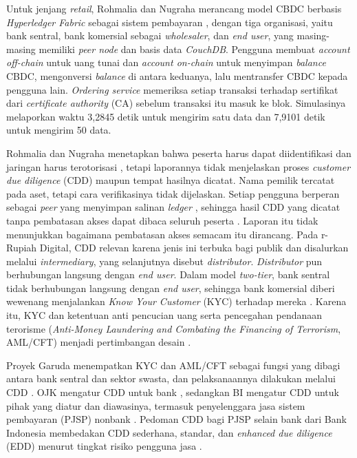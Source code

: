 Untuk jenjang \textit{retail}, Rohmalia dan Nugraha merancang model CBDC berbasis \textit{Hyperledger Fabric} sebagai sistem pembayaran \cite{rohmalia2023retail}, dengan tiga organisasi, yaitu bank sentral, bank komersial sebagai \textit{wholesaler}, dan \textit{end user}, yang masing-masing memiliki \textit{peer node} dan basis data \textit{CouchDB}. Pengguna membuat \textit{account off-chain} untuk uang tunai dan \textit{account on-chain} untuk menyimpan \textit{balance} CBDC, mengonversi \textit{balance} di antara keduanya, lalu mentransfer CBDC kepada pengguna lain. \textit{Ordering service} memeriksa setiap transaksi terhadap sertifikat dari \textit{certificate authority} (CA) sebelum transaksi itu masuk ke blok. Simulasinya melaporkan waktu 3,2845 detik untuk mengirim satu data dan 7,9101 detik untuk mengirim 50 data.

Rohmalia dan Nugraha menetapkan bahwa peserta harus dapat diidentifikasi dan jaringan harus terotorisasi \cite{rohmalia2023retail}, tetapi laporannya tidak menjelaskan proses \textit{customer due diligence} (CDD) maupun tempat hasilnya dicatat. Nama pemilik tercatat pada aset, tetapi cara verifikasinya tidak dijelaskan. Setiap pengguna berperan sebagai \textit{peer} yang menyimpan salinan \textit{ledger} \cite{rohmalia2023retail}, sehingga hasil CDD yang dicatat tanpa pembatasan akses dapat dibaca seluruh peserta \cite{androulaki2018}. Laporan itu tidak menunjukkan bagaimana pembatasan akses semacam itu dirancang. Pada r-Rupiah Digital, CDD relevan karena jenis ini terbuka bagi publik dan disalurkan melalui \textit{intermediary}, yang selanjutnya disebut \textit{distributor}. \textit{Distributor} pun berhubungan langsung dengan \textit{end user}. Dalam model \textit{two-tier}, bank sentral tidak berhubungan langsung dengan \textit{end user}, sehingga bank komersial diberi wewenang menjalankan \textit{Know Your Customer} (KYC) terhadap mereka \cite{bhawana2021}. Karena itu, KYC dan ketentuan anti pencucian uang serta pencegahan pendanaan terorisme (\textit{Anti-Money Laundering and Combating the Financing of Terrorism}, AML/CFT) menjadi pertimbangan desain \cite{Michalopoulos2025Privacy}.

Proyek Garuda menempatkan KYC dan AML/CFT sebagai fungsi yang dibagi antara bank sentral dan sektor swasta, dan pelaksanaannya dilakukan melalui CDD \cite{aryani2023critlit, Sun2022Behind}. OJK mengatur CDD untuk bank \cite{ojk2023pojk8}, sedangkan BI mengatur CDD untuk pihak yang diatur dan diawasinya, termasuk penyelenggara jasa sistem pembayaran (PJSP) nonbank \cite{bi2024pbi10}. Pedoman CDD bagi PJSP selain bank dari Bank Indonesia membedakan CDD sederhana, standar, dan \textit{enhanced due diligence} (EDD) menurut tingkat risiko pengguna jasa \cite[hlm.~6]{bi2023pedoman}.

